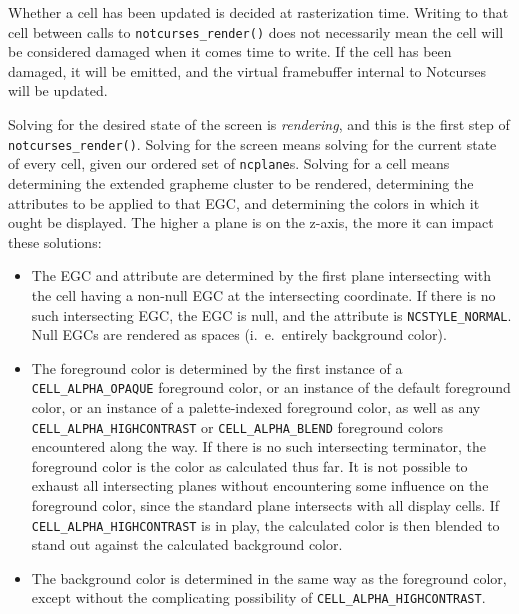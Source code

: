 \documentclass[letterpaper,10pt]{article}
\newenvironment{denseitemize}{
  \begin{itemize}
      \setlength{\itemsep}{0pt}
}{
  \end{itemize}
}
\begin{document}
Whether a cell has been updated is decided at rasterization time. Writing to
that cell between calls to \texttt{notcurses\_render()} does not necessarily
mean the cell will be considered damaged when it comes time to write. If the
cell has been damaged, it will be emitted, and the virtual framebuffer internal
to Notcurses will be updated.

Solving for the desired state of the screen is \textit{rendering}, and this is
the first step of \texttt{notcurses\_render()}. Solving for the screen means
solving for the current state of every cell, given our ordered set of
\texttt{ncplane}s. Solving for a cell means determining the extended grapheme
cluster to be rendered, determining the attributes to be applied to that EGC,
and determining the colors in which it ought be displayed. The higher a plane
is on the z-axis, the more it can impact these solutions:

\begin{denseitemize}
\item{The EGC and attribute are determined by the first plane intersecting with
      the cell having a non-null EGC at the intersecting coordinate. If there is
    no such intersecting EGC, the EGC is null, and the attribute is
    \texttt{NCSTYLE\_NORMAL}.} Null EGCs are rendered as spaces (i.\ e.\ entirely
    background color).
\item{The foreground color is determined by the first instance of a
    \texttt{CELL\_ALPHA\_OPAQUE} foreground color, or an instance of the
    default foreground color, or an instance of a palette-indexed foreground
    color, as well as any \texttt{CELL\_ALPHA\_HIGHCONTRAST} or \texttt{CELL\_ALPHA\_BLEND}
    foreground colors encountered along the way. If there is no such intersecting
    terminator, the foreground color is the color as calculated thus far. It is
    not possible to exhaust all intersecting planes without encountering some
    influence on the foreground color, since the standard plane intersects with
    all display cells. If \texttt{CELL\_ALPHA\_HIGHCONTRAST} is in play, the
    calculated color is then blended to stand out against the calculated background
    color.}
\item{The background color is determined in the same way as the foreground color,
    except without the complicating possibility of \texttt{CELL\_ALPHA\_HIGHCONTRAST}.}
\end{denseitemize}
\end{document}
